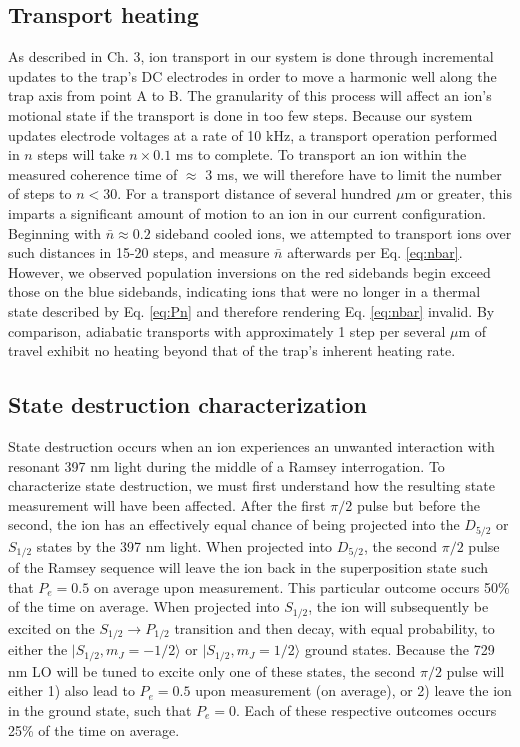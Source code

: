 
\subsection{Transport heating}

As described in Ch. 3, ion transport in our system is done through incremental updates to the trap's DC electrodes in order to move a harmonic well along the trap axis from point A to B. The granularity of this process will affect an ion's motional state if the transport is done in too few steps. Because our system updates electrode voltages at a rate of 10 kHz, a transport operation performed in $n$ steps will take $n \times 0.1$ ms to complete. To transport an ion within the measured coherence time of $\approx$ 3 ms, we will therefore have to limit the number of steps to $n < 30$. For a transport distance of several hundred $\mu$m or greater, this imparts a significant amount of motion to an ion in our current configuration. Beginning with $\bar{n} \approx 0.2$ sideband cooled ions, we attempted to transport ions over such distances in 15-20 steps, and measure $\bar{n}$ afterwards per Eq. \ref{eq:nbar}. However, we observed population inversions on the red sidebands begin exceed those on the blue sidebands, indicating ions that were no longer in a thermal state described by Eq. \ref{eq:Pn} and therefore rendering Eq. \ref{eq:nbar} invalid. By comparison, adiabatic transports with approximately 1 step per several $\mu$m of travel exhibit no heating beyond that of the trap's inherent heating rate. %



\subsection{State destruction characterization}

State destruction occurs when an ion experiences an unwanted interaction with resonant 397 nm light during the middle of a Ramsey interrogation. To characterize state destruction, we must first understand how the resulting state measurement will have been affected. After the first $\pi /2$ pulse but before the second, the ion has an effectively equal chance of being projected into the $D_{5/2}$ or $S_{1/2}$ states by the 397 nm light. When projected into $D_{5/2}$, the second $\pi /2$ pulse of the Ramsey sequence will leave the ion back in the superposition state such that $P_e = 0.5$ on average upon measurement. This particular outcome occurs 50\% of the time on average. When projected into $S_{1/2}$, the ion will subsequently be excited on the $S_{1/2} \rightarrow P_{1/2}$ transition and then decay, with equal probability, to either the $|S_{1/2}, m_J = -1/2 \rangle$ or $|S_{1/2}, m_J = 1/2 \rangle$ ground states. Because the 729 nm LO will be tuned to excite only one of these states, the second $\pi /2$ pulse will either 1) also lead to $P_e = 0.5$ upon measurement (on average), or 2) leave the ion in the ground state, such that $P_e = 0$. Each of these respective outcomes occurs 25\% of the time on average. 


